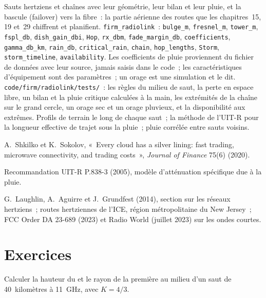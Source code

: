 \begin{build}
 Sauts hertziens et chaînes avec leur géométrie, leur bilan et leur pluie, et la bascule (failover) vers la fibre~: la partie aérienne des routes que les
  chapitres~15, 19 et~29 chiffrent et planifient.
 \texttt{firm\_radiolink}~: \texttt{bulge\_m}, \texttt{fresnel\_m}, \texttt{tower\_m}, \texttt{fspl\_db}, \texttt{dish\_gain\_dbi},
\texttt{Hop}, \texttt{rx\_dbm}, \texttt{fade\_margin\_db}, \texttt{coefficients}, \texttt{gamma\_db\_km}, \texttt{rain\_db}, \texttt{critical\_rain},
\texttt{chain}, \texttt{hop\_lengths}, \texttt{Storm}, \texttt{storm\_timeline}, \texttt{availability}.
 Les coefficients de pluie proviennent du fichier de données avec leur source, jamais saisis dans le code~; les caractéristiques d'équipement sont des paramètres~; un orage est une
  simulation et le dit.
 \texttt{code/firm/radiolink/tests/}~: les règles du milieu de saut, la perte en espace libre, un bilan et la pluie critique calculées à la main, les
  extrémités de la chaîne sur le grand cercle, un orage sec et un orage pluvieux, et la disponibilité aux extrêmes.
 Profils de terrain le long de chaque saut~; la méthode de l'UIT-R pour la longueur effective de trajet sous la pluie~; pluie corrélée entre
  sauts voisins.
\end{build}

\begin{omsources}
\item A.~Shkilko et K.~Sokolov, «~Every cloud has a silver lining: fast trading, microwave connectivity, and trading costs~», \emph{Journal of
Finance} 75(6) (2020).
\item Recommandation UIT-R P.838-3 (2005), modèle d'atténuation spécifique due à la pluie.
\item G.~Laughlin, A.~Aguirre et J.~Grundfest (2014), section sur les réseaux hertziens~; routes hertziennes de l'ICE, région métropolitaine du New Jersey~; FCC Order DA 23-689
(2023) et Radio World (juillet 2023) sur les ondes courtes.
\end{omsources}

\section{Exercices}

\begin{exercise}[$\star$]\label{exo:nw:long-haul-wireless:1}
Calculer la hauteur du  et le rayon de la première  au milieu d'un saut de 40~kilomètres à \qty{11}{\giga\hertz}, avec $K = 4/3$.
\end{exercise}

